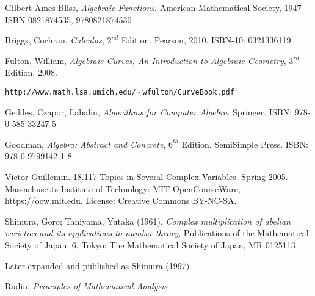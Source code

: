 

\begin{thebibliography}{9}

Gilbert Ames Bliss, {\it Algebraic Functions}. American Mathematical Society, 1947
ISBN 0821874535, 9780821874530

Briggs, Cochran, {\it Calculus}, $2^{nd}$ Edition.  Pearson, 2010.  ISBN-10: 0321336119

Fulton, William, {\it Algebraic Curves, An Introduction to Algebraic Geometry}, $3^{rd}$ Edition, 2008.

{\tt http://www.math.lsa.umich.edu/$\sim$wfulton/CurveBook.pdf}

Geddes, Czapor, Labahn, {\it Algorithms for Computer Algebra}. Springer.
ISBN: 978-0-585-33247-5

Goodman, {\it Algebra: Abstract and Concrete}, $6^{th}$ Edition.  SemiSimple Press.
ISBN: 978-0-9799142-1-8

Victor Guillemin. 18.117 Topics in Several Complex Variables. Spring 2005. Massachusetts Institute of Technology: MIT OpenCourseWare, https://ocw.mit.edu. License: Creative Commons BY-NC-SA.

Shimura, Goro; Taniyama, Yutaka (1961), {\it Complex multiplication of abelian varieties and its applications to number theory},
Publications of the Mathematical Society of Japan, 6, Tokyo: The Mathematical Society of Japan, MR 0125113

Later expanded and published as Shimura (1997)

Rudin, {\it Principles of Mathematical Analysis}

\end{thebibliography}

